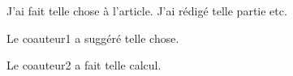 \label{Chapter1}

\contributions%
{
J'ai fait telle chose à l'article. J'ai rédigé telle partie
etc.


    Le coauteur1 a suggéré telle chose.

    Le coauteur2 a fait telle calcul.\\[1cm]
}


